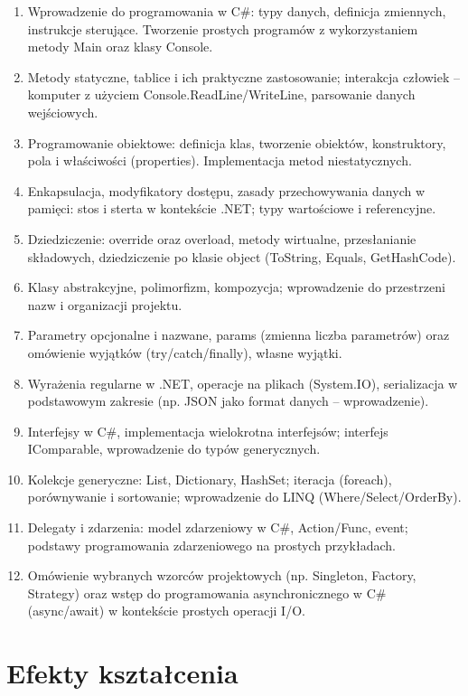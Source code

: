 \documentclass[12pt, a4paper]{article}
\begin{document}
\begin{enumerate}
  \item Wprowadzenie do programowania w C\#: typy danych, definicja zmiennych, instrukcje sterujące. Tworzenie prostych programów z wykorzystaniem metody Main oraz klasy Console.
  \item Metody statyczne, tablice i ich praktyczne zastosowanie; interakcja człowiek – komputer z użyciem Console.ReadLine/WriteLine, parsowanie danych wejściowych.
  \item Programowanie obiektowe: definicja klas, tworzenie obiektów, konstruktory, pola i właściwości (properties). Implementacja metod niestatycznych.
  \item Enkapsulacja, modyfikatory dostępu, zasady przechowywania danych w pamięci: stos i sterta w kontekście .NET; typy wartościowe i referencyjne.
  \item Dziedziczenie: override oraz overload, metody wirtualne, przesłanianie składowych, dziedziczenie po klasie object (ToString, Equals, GetHashCode).
  \item Klasy abstrakcyjne, polimorfizm, kompozycja; wprowadzenie do przestrzeni nazw i organizacji projektu.
  \item Parametry opcjonalne i nazwane, params (zmienna liczba parametrów) oraz omówienie wyjątków (try/catch/finally), własne wyjątki.
  \item Wyrażenia regularne w .NET, operacje na plikach (System.IO), serializacja w podstawowym zakresie (np. JSON jako format danych – wprowadzenie).
  \item Interfejsy w C\#, implementacja wielokrotna interfejsów; interfejs IComparable, wprowadzenie do typów generycznych.
  \item Kolekcje generyczne: List, Dictionary, HashSet; iteracja (foreach), porównywanie i sortowanie; wprowadzenie do LINQ (Where/Select/OrderBy).
  \item Delegaty i zdarzenia: model zdarzeniowy w C\#, Action/Func, event; podstawy programowania zdarzeniowego na prostych przykładach.
  \item Omówienie wybranych wzorców projektowych (np. Singleton, Factory, Strategy) oraz wstęp do programowania asynchronicznego w C\# (async/await) w kontekście prostych operacji I/O.
\end{enumerate}

\section{Efekty kształcenia}
\end{document}
